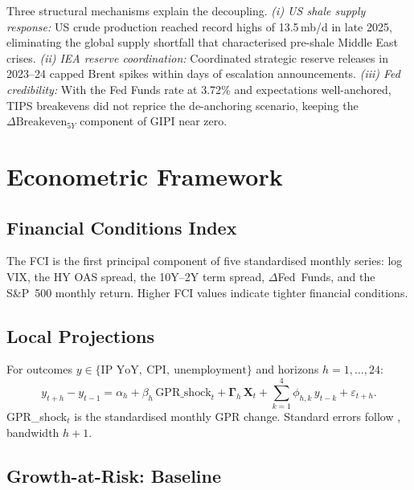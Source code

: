 \documentclass[12pt]{article}
\begin{document}
Three structural mechanisms explain the decoupling.
\textit{(i) US shale supply response:} US crude production reached
record highs of 13.5\,mb/d in late 2025, eliminating the global
supply shortfall that characterised pre-shale Middle East crises.
\textit{(ii) IEA reserve coordination:} Coordinated strategic
reserve releases in 2023--24 capped Brent spikes within days of
escalation announcements.
\textit{(iii) Fed credibility:} With the Fed Funds rate at 3.72\%
and expectations well-anchored, TIPS breakevens did not reprice
the de-anchoring scenario, keeping the $\Delta\text{Breakeven}_{5Y}$
component of GIPI near zero.

\section{Econometric Framework}\label{sec:framework}

\subsection{Financial Conditions Index}

The FCI is the first principal component of five standardised monthly series:
log VIX, the HY OAS spread, the 10Y--2Y term spread, $\Delta$Fed~Funds,
and the S\&P~500 monthly return.
Higher FCI values indicate tighter financial conditions.

\subsection{Local Projections}

For outcomes $y \in \{\text{IP YoY},\ \text{CPI},\ \text{unemployment}\}$
and horizons $h = 1,\ldots,24$:
\begin{equation}
y_{t+h} - y_{t-1} = \alpha_h + \beta_h\,\text{GPR\_shock}_t
+ \boldsymbol{\Gamma}_h\,\mathbf{X}_t
+ \sum_{k=1}^{4}\phi_{h,k}\,y_{t-k} + \varepsilon_{t+h}.
\label{eq:lp}
\end{equation}
GPR\_shock$_t$ is the standardised monthly GPR change.
Standard errors follow \citet{newey1987}, bandwidth $h+1$.

\subsection{Growth-at-Risk: Baseline}
\end{document}
